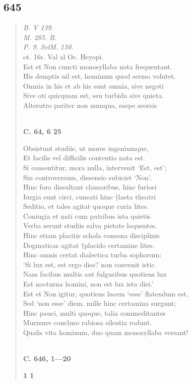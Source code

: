 \documentclass[11pt, a4paper]{report}
\begin{document}
            \subsection*{645}
      \begin{verse}
      \textit{B. V 139.} \\ \textit{M. 285. B.} \\ \textit{P. 9. SelM. 150.} \\ ot. 16r. Val al Oc. Heyopi. \\ Est et Non cuncti monosyllaba nota frequentant. \\ His demptis nil est, hominum quod sermo volutet. \\ Omnia in his et ab his sunt omnia, sive negoti \\ Sive oti quicquam est, seu turbida sive quieta. \\ Alterutro pariter non numqua, saepe seorsis \\ 
        ﻿\pagebreak 
     \marginpar{[112]} \begin{center} \textbf{C. 64, 6 25} \end{center}Obsistunt studiis, ut mores ingeniumque, \\ Et facilis vel difficilis contentio nata est. \\ Si consentitur, mora nulla, intervenit ‘Est, est’; \\ Sin controversum, dissensio subiciet ‘Non’. \\ Hinc fora dissultant clamoribus, hinc furiosi \\ Iurgia sunt circi, cuneati hinc †laeta theatri \\ Seditio, et tales agitat quoque curia lites. \\ Coniugia et nati cum patribus ista quietis \\ Verba serunt studiis salva pietate loquentes. \\ Hinc etiam placitis schola consona disciplinis \\ Dogmaticas agitat †placido certamine lites. \\ Hinc omnis certat dialectica turba sophorum: \\ ‘Si lux est, est ergo dies? non convenit istic. \\ Nam facibus multis aut fulguribus quotiens lux \\ Est nocturna homini, non est lux ista diei.’ \\ Est et Non igitur, quotiens lucem ‘esse’ flatendum est, \\ Sed ‘non esse’ diem. mille hinc certamina surgunt; \\ Hinc pauci, multi quoque, talia commeditantes \\ Murmure concluso rabiosa silentia rodunt. \\ Qualis vita hominum, duo quam monosyllaba versant! \\ 
        ﻿\pagebreak 
    \begin{center} \textbf{C. 646, 1—20} \end{center}\begin{center} \textbf{1 1} \end{center}
      \end{verse}
  
\end{document}
